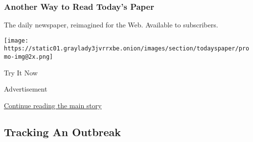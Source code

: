 \href{http://app.nytimes3xbfgragh.onion/todayspaper}{}

\hypertarget{another-way-to-read-todays-paper}{%
\subsubsection{Another Way to Read Today's
Paper}\label{another-way-to-read-todays-paper}}

The daily newspaper, reimagined for the Web. Available to subscribers.

\texttt{[image: https://static01.graylady3jvrrxbe.onion/images/section/todayspaper/promo-img@2x.png]}

Try It Now

Advertisement

\protect\hyperlink{after-mid1}{Continue reading the main story}

\hypertarget{tracking-an-outbreak}{%
\subsection{Tracking An Outbreak}\label{tracking-an-outbreak}}

